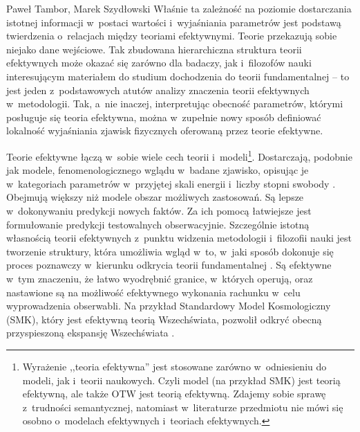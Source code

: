 \begin{artplenv2auth}{Paweł Tambor, Marek Szydłowski}
Właśnie ta zależność na poziomie dostarczania istotnej informacji w~postaci wartości i~wyjaśniania parametrów jest podstawą twierdzenia o~relacjach między teoriami efektywnymi. Teorie przekazują sobie niejako dane wejściowe. Tak zbudowana hierarchiczna struktura teorii efektywnych może okazać się zarówno dla badaczy, jak i~filozofów nauki interesującym materiałem do studium dochodzenia do teorii fundamentalnej -- to jest jeden z~podstawowych atutów analizy znaczenia teorii efektywnych w~metodologii. Tak, a~nie inaczej, interpretując obecność parametrów, którymi posługuje się teoria efektywna, można w~zupełnie nowy sposób definiować lokalność wyjaśniania zjawisk fizycznych oferowaną przez teorie efektywne.

Teorie efektywne łączą w~sobie wiele cech teorii i~modeli\footnote{Wyrażenie ,,teoria efektywna'' jest stosowane zarówno w~odniesieniu do modeli, jak i~teorii naukowych. Czyli model (na przykład SMK) jest teorią efektywną, ale także OTW jest teorią efektywną. Zdajemy sobie sprawę z~trudności semantycznej, natomiast w~literaturze przedmiotu nie mówi się osobno o~modelach efektywnych i~teoriach efektywnych.}. Dostarczają, podobnie jak modele, fenomenologicznego wglądu w~badane zjawisko, opisując je w~kategoriach parametrów w~przyjętej skali energii i~liczby stopni swobody
\parencite[][]{draganescu_effective_2004}. %
 Obejmują większy niż modele obszar możliwych zastosowań. Są lepsze w~dokonywaniu predykcji nowych faktów. Za ich pomocą łatwiejsze jest formułowanie predykcji testowalnych obserwacyjnie. Szczególnie istotną własnością teorii efektywnych z~punktu widzenia metodologii i~filozofii nauki jest tworzenie struktury, która umożliwia wgląd w~to, w~jaki sposób dokonuje się proces poznawczy w~kierunku odkrycia teorii fundamentalnej 
\parencite[][]{castellani_reductionism_2002}. %
 Są efektywne w~tym znaczeniu, że łatwo wyodrębnić granice, w~których operują, oraz nastawione są na możliwość efektywnego wykonania rachunku w~celu wyprowadzenia obserwabli. Na przykład Standardowy Model Kosmologiczny (SMK), który jest efektywną teorią Wszechświata, pozwolił odkryć obecną przyspieszoną ekspansję Wszechświata 
\parencites[][]{perlmutter_discovery_1998}[][]{riess_observational_1998}[por.][]{tegmark_cosmological_2004}. %

\end{artplenv2auth}
